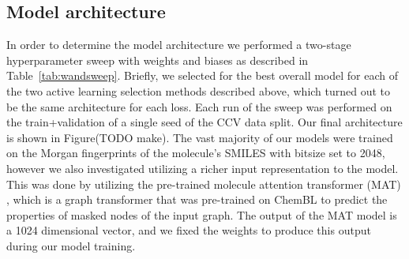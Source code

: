 \documentclass[journal=jmcmar,manuscript=article]{achemso}
\begin{document}
\subsection{Model architecture}
In order to determine the model architecture we performed a two-stage hyperparameter sweep with weights and biases\cite{wandb} as described in Table~\ref{tab:wandsweep}. Briefly, we selected for the best overall model for each of the two active learning selection methods described above, which turned out to be the same architecture for each loss. Each run of the sweep was performed on the train+validation of a single seed of the CCV data split. Our final architecture is shown in Figure(TODO make). The vast majority of our models were trained on the Morgan fingerprints of the molecule's SMILES with bitsize set to 2048, however we also investigated utilizing a richer input representation to the model. This was done by utilizing the pre-trained molecule attention transformer (MAT) \cite{MAT}, which is a graph transformer that was pre-trained on ChemBL\cite{Chembl} to predict the properties of masked nodes of the input graph. The output of the MAT model is a 1024 dimensional vector, and we fixed the weights to produce this output during our model training.
\end{document}
